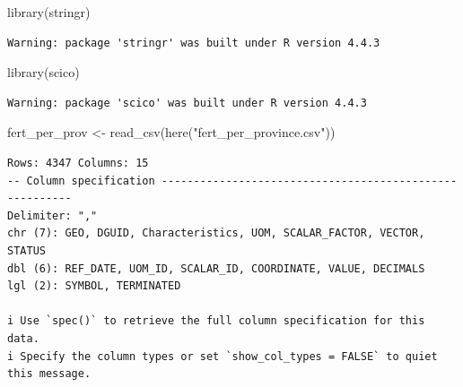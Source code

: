 \documentclass[
  letterpaper,
  DIV=11,
  numbers=noendperiod]{scrartcl}
\newenvironment{Shaded}{\begin{snugshade}}{\end{snugshade}}
\newcommand{\FunctionTok}[1]{\textcolor[rgb]{0.28,0.35,0.67}{#1}}
\newcommand{\NormalTok}[1]{\textcolor[rgb]{0.00,0.23,0.31}{#1}}
\newcommand{\OtherTok}[1]{\textcolor[rgb]{0.00,0.23,0.31}{#1}}
\newcommand{\StringTok}[1]{\textcolor[rgb]{0.13,0.47,0.30}{#1}}
\begin{document}
\begin{Shaded}
\begin{Highlighting}[]
\FunctionTok{library}\NormalTok{(stringr)}
\end{Highlighting}
\end{Shaded}

\begin{verbatim}
Warning: package 'stringr' was built under R version 4.4.3
\end{verbatim}

\begin{Shaded}
\begin{Highlighting}[]
\FunctionTok{library}\NormalTok{(scico)}
\end{Highlighting}
\end{Shaded}

\begin{verbatim}
Warning: package 'scico' was built under R version 4.4.3
\end{verbatim}

\begin{Shaded}
\begin{Highlighting}[]
\NormalTok{fert\_per\_prov }\OtherTok{\textless{}{-}} \FunctionTok{read\_csv}\NormalTok{(}\FunctionTok{here}\NormalTok{(}\StringTok{"fert\_per\_province.csv"}\NormalTok{))}
\end{Highlighting}
\end{Shaded}

\begin{verbatim}
Rows: 4347 Columns: 15
-- Column specification --------------------------------------------------------
Delimiter: ","
chr (7): GEO, DGUID, Characteristics, UOM, SCALAR_FACTOR, VECTOR, STATUS
dbl (6): REF_DATE, UOM_ID, SCALAR_ID, COORDINATE, VALUE, DECIMALS
lgl (2): SYMBOL, TERMINATED

i Use `spec()` to retrieve the full column specification for this data.
i Specify the column types or set `show_col_types = FALSE` to quiet this message.
\end{verbatim}
\end{document}
